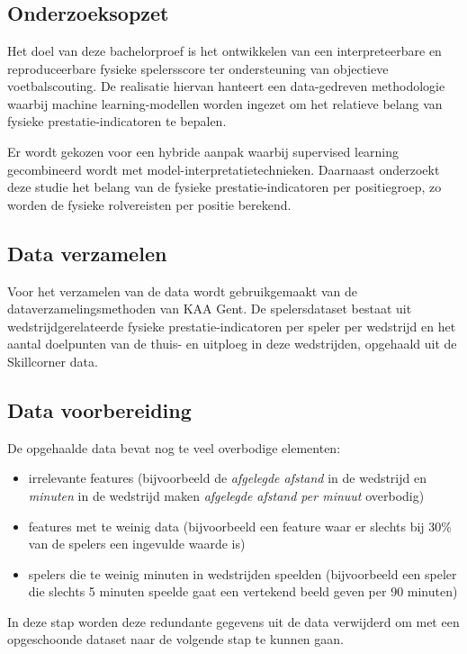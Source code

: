 
\chapter{}%
\label{ch:methodologie}

\section{Onderzoeksopzet}

Het doel van deze bachelorproef is het ontwikkelen van een interpreteerbare en reproduceerbare fysieke spelersscore ter ondersteuning van objectieve voetbalscouting. De realisatie hiervan hanteert een data-gedreven methodologie waarbij machine learning-modellen worden ingezet om het relatieve belang van fysieke prestatie-indicatoren te bepalen.

Er wordt gekozen voor een hybride aanpak waarbij supervised learning gecombineerd wordt met model-interpretatietechnieken. Daarnaast onderzoekt deze studie het belang van de fysieke prestatie-indicatoren per positiegroep, zo worden de fysieke rolvereisten per positie berekend.



\section{Data verzamelen}

Voor het verzamelen van de data wordt gebruikgemaakt van de dataverzamelingsmethoden van KAA Gent. De spelersdataset bestaat uit wedstrijdgerelateerde fysieke prestatie-indicatoren per speler per wedstrijd en het aantal doelpunten van de thuis- en uitploeg in deze wedstrijden, opgehaald uit de Skillcorner data. 

\section{Data voorbereiding}

De opgehaalde data bevat nog te veel overbodige elementen: 
\begin{itemize}
    \item irrelevante features (bijvoorbeeld de \emph{afgelegde afstand} in de wedstrijd en \emph{minuten} in de wedstrijd maken \emph{afgelegde afstand per minuut} overbodig)
    \item features met te weinig data (bijvoorbeeld een feature waar er slechts bij 30\% van de spelers een ingevulde waarde is)
    \item spelers die te weinig minuten in wedstrijden speelden (bijvoorbeeld een speler die slechts 5 minuten speelde gaat een vertekend beeld geven per 90 minuten)
\end{itemize}
In deze stap worden deze redundante gegevens uit de data verwijderd om met een opgeschoonde dataset naar de volgende stap te kunnen gaan.

